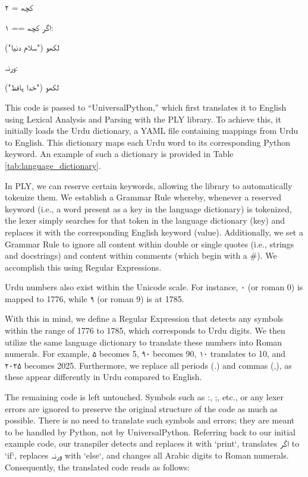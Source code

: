 \documentclass[conference]{IEEEtran}
\begin{document}
\begin{urdu} %
\urdufont 
کچھ = ۲

اگر کچھ == ۱:

\quad لکھو ("سلام دنیا")

ورنہ:

\quad لکھو ("خدا ہافظ")

\end{urdu} %

This code is passed to “UniversalPython,” which first translates it to English using Lexical Analysis and Parsing with the PLY library. To achieve this, it initially loads the Urdu dictionary, a YAML file containing mappings from Urdu to English. This dictionary maps each Urdu word to its corresponding Python keyword. An example of such a dictionary is provided in Table \ref{tab:language_dictionary}. 

In PLY, we can reserve certain keywords, allowing the library to automatically tokenize them. We establish a Grammar Rule whereby, whenever a reserved keyword (i.e., a word present as a key in the language dictionary) is tokenized, the lexer simply searches for that token in the language dictionary (key) and replaces it with the corresponding English keyword (value). Additionally, we set a Grammar Rule to ignore all content within double or single quotes (i.e., strings and docstrings) and content within comments (which begin with a \#). We accomplish this using Regular Expressions.

Urdu numbers also exist within the Unicode scale. For instance, \texturdu{۰} (or roman 0) is mapped to 1776, while \texturdu{۹} (or roman 9) is at 1785. 

With this in mind, we define a Regular Expression that detects any symbols within the range of 1776 to 1785, which corresponds to Urdu digits. We then utilize the same language dictionary to translate these numbers into Roman numerals. For example, \texturdu{۵} becomes 5, \texturdu{۹۰} becomes 90, \texturdu{۱۰} translates to 10, and \texturdu{۲۰۲۵} becomes 2025. Furthermore, we replace all periods (.) and commas (,), as these appear differently in Urdu compared to English.

The remaining code is left untouched. Symbols such as :, ;, etc., or any lexer errors are ignored to preserve the original structure of the code as much as possible. There is no need to translate such symbols and errors; they are meant to be handled by Python, not by UniversalPython. Referring back to our initial example code, our transpiler detects and replaces it with `print`, translates \texturdu{اگر} to `if`, replaces \texturdu{ورنہ} with `else`, and changes all Arabic digits to Roman numerals. Consequently, the translated code reads as follows:
\end{document}
